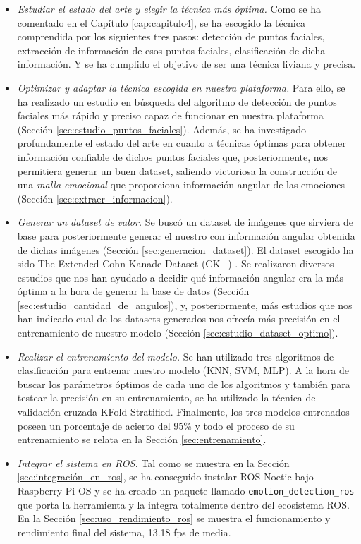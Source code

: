 \begin{itemize}
    \item \textit{Estudiar el estado del arte y elegir la técnica más óptima.} Como se ha comentado en el Capítulo \ref{cap:capitulo4}, se ha escogido la técnica comprendida por los siguientes tres pasos: detección de puntos faciales, extracción de información de esos puntos faciales, clasificación de dicha información. Y se ha cumplido el objetivo de ser una técnica liviana y precisa.
    
    \item \textit{Optimizar y adaptar la técnica escogida en nuestra plataforma.} Para ello, se ha realizado un estudio en búsqueda del algoritmo de detección de puntos faciales más rápido y preciso capaz de funcionar en nuestra plataforma (Sección \ref{sec:estudio_puntos_faciales}). Además, se ha investigado profundamente el estado del arte en cuanto a técnicas óptimas para obtener información confiable de dichos puntos faciales que, posteriormente, nos permitiera generar un buen dataset, saliendo victoriosa la construcción de una \textit{malla emocional} \cite{mediapipe_emotions} que proporciona información angular de las emociones (Sección \ref{sec:extraer_informacion}).
    
    \item \textit{Generar un dataset de valor.} Se buscó un dataset de imágenes que sirviera de base para posteriormente generar el nuestro con información angular obtenida de dichas imágenes (Sección \ref{sec:generacion_dataset}). El dataset escogido ha sido The Extended Cohn-Kanade Dataset (CK+) \cite{Kanade1}\cite{Kanade2}. Se realizaron diversos estudios que nos han ayudado a decidir qué información angular era la más óptima a la hora de generar la base de datos (Sección \ref{sec:estudio_cantidad_de_angulos}), y, posteriormente, más estudios que nos han indicado cual de los datasets generados nos ofrecía más precisión en el entrenamiento de nuestro modelo (Sección \ref{sec:estudio_dataset_optimo}).
    
    \item \textit{Realizar el entrenamiento del modelo.} Se han utilizado tres algoritmos de clasificación para entrenar nuestro modelo (KNN, SVM, MLP). A la hora de buscar los parámetros óptimos de cada uno de los algoritmos y también para testear la precisión en su entrenamiento, se ha utilizado la técnica de validación cruzada KFold Stratified. Finalmente, los tres modelos entrenados poseen un porcentaje de acierto del 95\% y todo el proceso de su entrenamiento se relata en la Sección \ref{sec:entrenamiento}.
    
    \item \textit{Integrar el sistema en ROS.} Tal como se muestra en la Sección \ref{sec:integración_en_ros}, se ha conseguido instalar ROS Noetic bajo Raspberry Pi OS y se ha creado un paquete llamado \verb|emotion_detection_ros| que porta la herramienta y la integra totalmente dentro del ecosistema ROS. En la Sección \ref{sec:uso_rendimiento_ros} se muestra el funcionamiento y rendimiento final del sistema, 13.18 fps de media.
\end{itemize}

